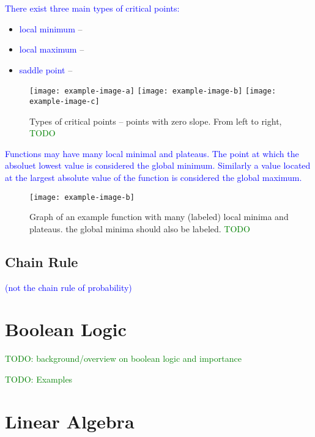 \textcolor{blue}{There exist three main types of critical points:}

\begin{itemize}
	\item \textcolor{blue}{local minimum} -- 
	\item \textcolor{blue}{local maximum} -- 
	\item \textcolor{blue}{saddle point} -- 
\end{itemize}

\begin{figure}[htp]
	\centering
	\texttt{[image: example-image-a]}\hfil
	\texttt{[image: example-image-b]}\hfil
	\texttt{[image: example-image-c]}
\caption{Types of critical points -- points with zero slope. From left to right, \textcolor{green}{TODO}}
\label{fig:calc_critical_points}
\end{figure}


\textcolor{blue}{Functions may have many local minimal and plateaus. The point at which the absoluet lowest value is considered the {global minimum}. Similarly a value located at the largest absolute value of the function is considered the {global maximum}. }

\begin{figure}
	\centering
	\texttt{[image: example-image-b]}\hfil
	\caption{Graph of an example function with many (labeled) local minima and plateaus. the global minima should also be labeled. \textcolor{green}{TODO}}
	\label{fig:calc_fn_deriv}
\end{figure}

\subsection{Chain Rule}

\textcolor{blue}{(not the chain rule of probability)}



\section{Boolean Logic}

\textcolor{green}{TODO: background/overview on boolean logic and importance}

\textcolor{green}{TODO: Examples}


\section{Linear Algebra}

